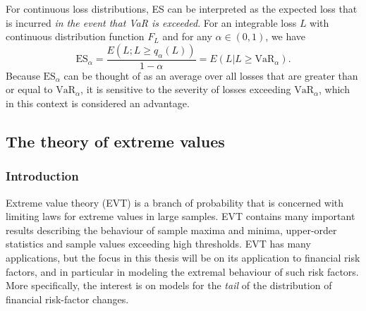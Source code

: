 \documentclass[a4paper,11pt]{article}
\theoremstyle{definition}
\theoremstyle{definition}
\theoremstyle{definition}
\theoremstyle{definition}
\theoremstyle{remark}
\begin{document}
For continuous loss distributions, ES can be interpreted as the expected loss that is incurred \emph{in the event that VaR is exceeded}. For an integrable loss \(L\) with continuous distribution function \(F_L\) and for any \(\alpha \in (0, 1)\), we have
\begin{equation}
\text{ES}_{\alpha} = \frac{E(L; L \geq q_{\alpha}(L))}{1-\alpha} = E(L \vert L \geq \text{VaR}_{\alpha}).
\label{eq:ES2}
\end{equation}
Because \(\text{ES}_{\alpha}\) can be thought of as an average over all losses that are greater than or equal to \(\text{VaR}_{\alpha}\), it is sensitive to the severity of losses exceeding \(\text{VaR}_{\alpha}\), which in this context is considered an advantage.

\newpage

\hypertarget{sec:evt}{%
\subsection{The theory of extreme values}\label{sec:evt}}

\hypertarget{introduction-2}{%
\subsubsection{Introduction}\label{introduction-2}}

Extreme value theory (EVT) is a branch of probability that is concerned with limiting laws for extreme values in large samples. EVT contains many important results describing the behaviour of sample maxima and minima, upper-order statistics and sample values exceeding high thresholds. EVT has many applications, but the focus in this thesis will be on its application to financial risk factors, and in particular in modeling the extremal behaviour of such risk factors. More specifically, the interest is on models for the \emph{tail} of the distribution of financial risk-factor changes.
\end{document}
